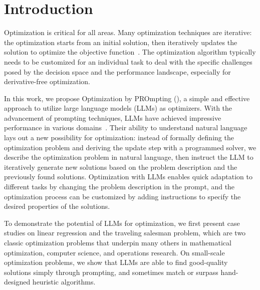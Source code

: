 \section{Introduction}
\label{sec:intro}

Optimization is critical for all areas. Many optimization techniques are iterative: the optimization starts from an initial solution, then iteratively updates the solution to optimize the objective function~\citep{amari1993backpropagation,qian1999momentum,kingma2014adam,back1993overview,rios2013derivative,reeves1993modern}.
The optimization algorithm typically needs to be customized for an individual task to deal with the specific challenges posed by the decision space and the performance landscape, especially for derivative-free optimization.

In this work, we propose Optimization by PROmpting (\name{}), a simple and effective approach to utilize large language models (LLMs) as optimizers.
With the advancement of prompting techniques, LLMs have achieved impressive performance in various domains~\citep{wei2022chain,kojima2022large,wang2022self,zhou2022least,madaan2023self,bai2022constitutional,chen2023teaching}.
Their ability to understand natural language lays out a new possibility for optimization: instead of formally defining the optimization problem and deriving the update step with a programmed solver, we describe the optimization problem in natural language, then instruct the LLM to iteratively generate new solutions based on the problem description and the previously found solutions.
Optimization with LLMs enables quick adaptation to different tasks by changing the problem description in the prompt, and the optimization process can be customized by adding instructions to specify the desired properties of the solutions.

To demonstrate the potential of LLMs for optimization, we first present case studies on linear regression and the traveling salesman problem, which are two classic optimization problems that underpin many others in mathematical optimization, computer science, and operations research.
On small-scale optimization problems, we show that LLMs are able to find good-quality solutions simply through prompting, and sometimes match or surpass hand-designed heuristic algorithms.

